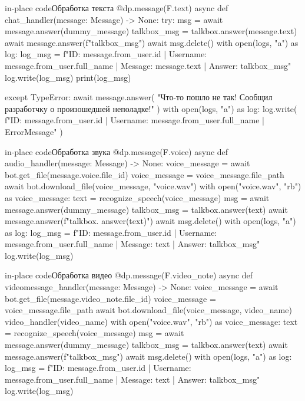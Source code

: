 
\begin{codepiece}{in-place code}{Обработка текста}
    @dp.message(F.text)
    async def chat_handler(message: Message) -> None:
        try:
            msg = await message.answer(dummy_message)
            talkbox_msg = talkbox.answer(message.text)
            await message.answer(f"{talkbox_msg}\n{}")
            await msg.delete()
            with open(logs, "a") as log:
                log_msg = f"ID: {message.from_user.id} | Username: {message.from_user.full_name} | Message: {message.text} | Answer: {talkbox_msg}\n\n"
                log.write(log_msg)
                print(log_msg)

        except TypeError:
            await message.answer(
                "Что-то пошло не так! Сообщил разработчку о произошедшей неполадке!"
            )
            with open(logs, "a") as log:
                log.write(
                    f"ID: {message.from_user.id} | Username: {message.from_user.full_name} | ErrorMessage\n\n"
                )


\end{codepiece}

\begin{codepiece}{in-place code}{Обработка звука}
@dp.message(F.voice)
async def audio_handler(message: Message) -> None:
    voice_message = await bot.get_file(message.voice.file_id)
    voice_message = voice_message.file_path
    await bot.download_file(voice_message, "voice.wav")
    with open("voice.wav", "rb") as voice_message:
        text = recognize_speech(voice_message)
        msg = await message.answer(dummy_message)
        talkbox_msg = talkbox.answer(text)
        await message.answer(f"{talkbox.
            answer(text)}\n{}")
        await msg.delete()
        with open(logs, "a") as log:
            log_msg = f"ID: {message.from_user.id} | Username: {message.from_user.full_name} | Message: {text} | Answer: {talkbox_msg}\n\n"
            log.write(log_msg)
\end{codepiece}

\begin{codepiece}{in-place code}{Обработка видео}
@dp.message(F.video_note)
async def videomessage_handler(message: Message) -> None:
    voice_message = await bot.get_file(message.video_note.file_id)
    voice_message = voice_message.file_path
    await bot.download_file(voice_message, video_name)
    video_handler(video_name)
    with open("voice.wav", "rb") as voice_message:
        text = recognize_speech(voice_message)
        msg = await message.answer(dummy_message)
        talkbox_msg = talkbox.answer(text)
        await message.answer(f"{talkbox_msg}\n{}")
        await msg.delete()
        with open(logs, "a") as log:
            log_msg = f"ID: {message.from_user.id} | Username: {message.from_user.full_name} | Message: {text} | Answer: {talkbox_msg}\n\n"
            log.write(log_msg)

\end{codepiece}


